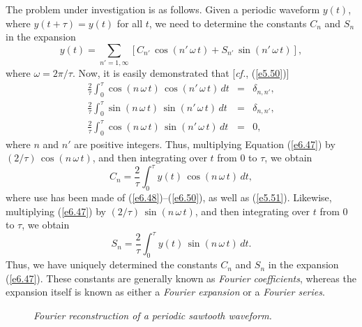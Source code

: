 The problem under investigation is as follows. Given a periodic waveform $y(t)$,
where $y(t+\tau)=y(t)$ for all $t$, we need to determine the constants $C_n$ and $S_n$ in the
expansion
\begin{equation}\label{e6.47}
y(t) = \sum_{n'=1,\infty} \left[C_{n'}\,\cos(n'\,\omega\,t)+ S_{n'}\,\sin(n'\,\omega\,t)\right],
\end{equation}
where $\omega=2\pi/\tau$. 
Now, it is easily demonstrated that [{\em cf.}, (\ref{e5.50})]
\begin{eqnarray}\label{e6.48}
\frac{2}{\tau} \int_0^\tau \cos(n\,\omega\,t)\,\cos(n'\,\omega\,t)\,dt &=& \delta_{n,n'},\\[0.5ex]
\frac{2}{\tau} \int_0^\tau \sin(n\,\omega\,t)\,\sin(n'\,\omega\,t)\,dt &=& \delta_{n,n'},\\[0.5ex]
\frac{2}{\tau} \int_0^\tau \cos(n\,\omega\,t)\,\sin(n'\,\omega\,t)\,dt &=& 0,\label{e6.50}
\end{eqnarray}
where $n$ and $n'$ are positive integers. Thus, multiplying Equation (\ref{e6.47}) by
$(2/\tau)\,\cos(n\,\omega\,t)$, and then integrating over $t$ from $0$ to $\tau$, we obtain
\begin{equation}\label{e6.51}
C_n = \frac{2}{\tau}\int_0^\tau y(t)\,\cos(n\,\omega\,t)\,dt,
\end{equation}
where use has been made of (\ref{e6.48})--(\ref{e6.50}),  as well as (\ref{e5.51}). Likewise, multiplying
(\ref{e6.47}) by $(2/\tau)\,\sin(n\,\omega\,t)$, and  then integrating over $t$ from $0$ to $\tau$, we obtain
\begin{equation}\label{e6.52}
S_n = \frac{2}{\tau}\int_0^\tau y(t)\,\sin(n\,\omega\,t)\,dt.
\end{equation}
Thus, we have uniquely determined the constants $C_n$ and $S_n$ in the expansion (\ref{e6.47}). These constants are generally known as {\em Fourier coefficients},
whereas the expansion itself  is known
as either a {\em Fourier expansion}\/  or a {\em Fourier series}. 

\begin{figure}
\epsfysize=4in
\centerline{}
\caption{\em Fourier reconstruction of a periodic sawtooth waveform.}\label{f6.6}   
\end{figure}

